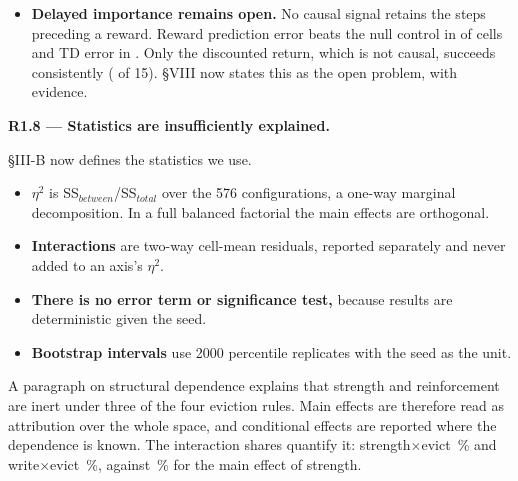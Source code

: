 \documentclass[11pt]{article}
\newcommand{\comment}[1]{\par\medskip\noindent\textbf{#1}\par}
\begin{document}
\begin{itemize}
):
points where AUC $\geq 0.97$, and
near chance. Count-based novelty beats the null control in
of 
cells when the important states are the novel ones.
\item \textbf{Delayed importance remains open.} No causal signal retains the
steps preceding a reward. Reward prediction error beats the null control in
of 
cells and TD error in
.
Only the discounted return, which is not causal, succeeds consistently
(
of 15). §VIII now states this as the open problem, with evidence.
\end{itemize}

\comment{R1.8 --- Statistics are insufficiently explained.}
§III-B now defines the statistics we use.
\begin{itemize}
\item \textbf{$\eta^2$} is SS$_{between}$/SS$_{total}$ over the 576
configurations, a one-way marginal decomposition. In a full balanced factorial
the main effects are orthogonal.
\item \textbf{Interactions} are two-way cell-mean residuals, reported
separately and never added to an axis's $\eta^2$.
\item \textbf{There is no error term or significance test,} because results
are deterministic given the seed.
\item \textbf{Bootstrap intervals} use 2000 percentile replicates with the
seed as the unit.
\end{itemize}
A paragraph on structural dependence explains that strength and reinforcement
are inert under three of the four eviction rules. Main effects are therefore
read as attribution over the whole space, and conditional effects are reported
where the dependence is known. The interaction shares quantify it:
strength$\times$evict
\,\% and
write$\times$evict
\,\%, against
\,\% for the main effect of
strength.
\end{document}
